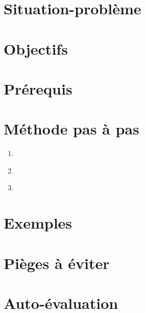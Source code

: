 \documentclass[a4paper,11pt]{article}
\begin{document}
\section*{Situation-problème}
\section*{Objectifs}
\section*{Prérequis}
\section*{Méthode pas à pas}
\begin{enumerate}[nosep]
  \item ~
  \item ~
  \item ~
\end{enumerate}
\section*{Exemples}
\section*{Pièges à éviter}
\section*{Auto-évaluation}
\end{document}
